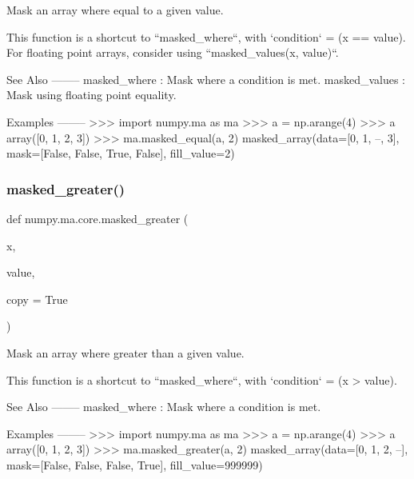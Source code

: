 \begin{DoxyVerb}Mask an array where equal to a given value.

This function is a shortcut to ``masked_where``, with
`condition` = (x == value).  For floating point arrays,
consider using ``masked_values(x, value)``.

See Also
--------
masked_where : Mask where a condition is met.
masked_values : Mask using floating point equality.

Examples
--------
>>> import numpy.ma as ma
>>> a = np.arange(4)
>>> a
array([0, 1, 2, 3])
>>> ma.masked_equal(a, 2)
masked_array(data=[0, 1, --, 3],
             mask=[False, False,  True, False],
       fill_value=2)\end{DoxyVerb}
 \mbox{\label{namespacenumpy_1_1ma_1_1core_a4d90775c8f21ae0945388a167c9bce72}} 
\subsubsection{\texorpdfstring{masked\+\_\+greater()}{masked\_greater()}}
{\footnotesize\ttfamily def numpy.\+ma.\+core.\+masked\+\_\+greater (\begin{DoxyParamCaption}\item[{}]{x,  }\item[{}]{value,  }\item[{}]{copy = {\ttfamily True} }\end{DoxyParamCaption})}

\begin{DoxyVerb}Mask an array where greater than a given value.

This function is a shortcut to ``masked_where``, with
`condition` = (x > value).

See Also
--------
masked_where : Mask where a condition is met.

Examples
--------
>>> import numpy.ma as ma
>>> a = np.arange(4)
>>> a
array([0, 1, 2, 3])
>>> ma.masked_greater(a, 2)
masked_array(data=[0, 1, 2, --],
             mask=[False, False, False,  True],
       fill_value=999999)\end{DoxyVerb}
 \mbox{\label{namespacenumpy_1_1ma_1_1core_a92f728fc2b2d69a7c856282d99dc97ec}} 
